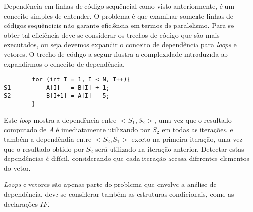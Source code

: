Dependência em linhas de código sequêncial como visto anteriormente, é um
conceito simples de entender.
O problema é que examinar somente linhas de códigos sequênciais não garante 
eficiência em termos de paralelismo. 
Para se obter tal eficiência deve-se considerar os trechos de
código que são mais executados, ou seja devemos expandir o conceito de
dependência para \textit{loops} e vetores.
O trecho de código a seguir ilustra a complexidade introduzida ao expandirmos o
conceito de dependência.

\begin{verbatim}
        for (int I = 1; I < N; I++){
S1          A[I]   = B[I] + 1;
S2          B[I+1] = A[I] - 5;
        }
\end{verbatim}

Este \textit{loop} mostra a dependência entre $<S_1,S_2>$, uma vez que o
resultado computado de $A$ é imediatamente utilizando por $S_2$ em todas as
iterações, e também a dependêndia entre $<S_2,S_1>$ exceto na primeira iteração,
uma vez que o resultado obtido por $S_2$ será utilizado na iteração anterior.
Detectar estas dependências é difícil, considerando que cada iteração acessa 
diferentes elementos do vetor.

\textit{Loops} e vetores são apenas parte do problema que envolve a análise de
dependência, deve-se considerar também as estruturas condicionais, como as
declarações $IF$.




